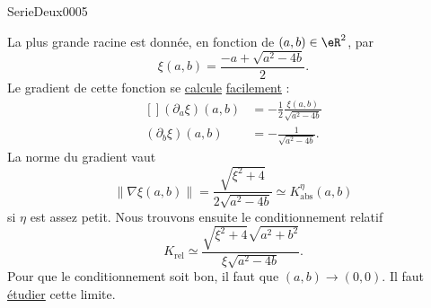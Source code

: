 
\begin{corrige}{SerieDeux0005}

	La plus grande racine est donnée, en fonction de $(a,b)\in\eR^2$, par
	\begin{equation}
		\xi(a,b)=\frac{ -a+\sqrt{a^2-4b} }{2}.
	\end{equation}
	Le gradient de cette fonction se \href{http://www.sagemath.org}{calcule} \href{http://www.sagemath.org/doc/reference/sage/plot/plot_field.html}{facilement} :
	\begin{equation}
		\begin{aligned}[]
			(\partial_a\xi)(a,b)&=-\frac{ 1 }{2}\frac{ \xi(a,b) }{ \sqrt{a^2-4b} }\\
			(\partial_b\xi)(a,b)&=-\frac{1}{ \sqrt{a^2-4b} }.
		\end{aligned}
	\end{equation}
	La norme du gradient vaut
	\begin{equation}
		\| \nabla\xi(a,b) \|=\frac{ \sqrt{\xi^2+4} }{ 2\sqrt{a^2-4b} }\simeq K^{\eta}_{\text{abs}}(a,b)
	\end{equation}
	si $\eta$ est assez petit. Nous trouvons ensuite le conditionnement relatif
	\begin{equation}
		K_{\text{rel}}\simeq \frac{    \sqrt{\xi^2+4}\sqrt{a^2+b^2}    }{ \xi\sqrt{a^2-4b} }.
	\end{equation}
	Pour que le conditionnement soit bon, il faut que $(a,b)\to(0,0)$. Il faut \href{http://student.ulb.ac.be/~lclaesse/CdI1.pdf}{étudier} cette limite.

\end{corrige}
